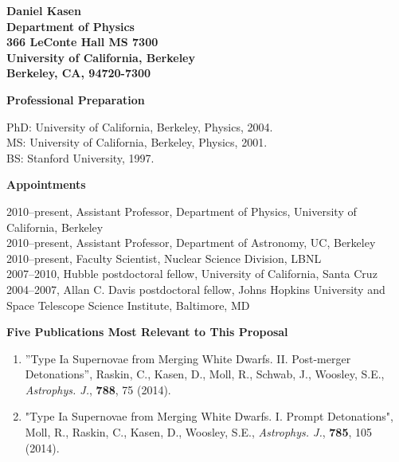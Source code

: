 \documentclass[11pt,letterpaper,english]{article}
\begin{document}
\setlength{\parindent}{0in} %

\pagestyle{fancy}   \renewcommand{%
\headrulewidth}{0.0pt}



\centering 
{\bf Daniel Kasen}\\
{\bf Department of Physics  \\
  366 LeConte Hall MS 7300 \\
  University of California, Berkeley \\
  Berkeley, CA, 94720-7300
} \smallskip

\begin{flushleft} {\bf Professional Preparation}
{\parindent 16pt

PhD: University of California, Berkeley, Physics,  2004.\\ 
MS: University of California, Berkeley, Physics,  2001.\\ 
BS: Stanford University, 1997. \\
}

\vspace{.04in}
{\bf Appointments}
{\parindent 16pt

2010--present, Assistant Professor, Department of Physics, University of California, Berkeley \\
2010--present, Assistant Professor, Department of Astronomy, UC, Berkeley \\
2010--present, Faculty Scientist, Nuclear Science Division, LBNL \\
2007--2010, Hubble postdoctoral fellow, University of California, Santa Cruz \\
2004--2007, Allan C. Davis postdoctoral fellow, Johns Hopkins University and Space Telescope Science Institute, Baltimore, MD \\
}

\vspace{.04in}
{\bf Five Publications Most Relevant to This Proposal}
\vspace{-6pt}
\begin{enumerate} \itemsep1pt \parskip0pt 

\item ''Type Ia Supernovae from Merging White Dwarfs. II. Post-merger Detonations'', Raskin, C., Kasen, D., 
Moll, R., Schwab, J., Woosley, S.E., \emph{Astrophys. J.}, {\bf 788}, 75 (2014).

\item "Type Ia Supernovae from Merging White Dwarfs. I. Prompt Detonations", 
Moll, R., Raskin, C., Kasen, D.,  Woosley, S.E., \emph{Astrophys. J.}, {\bf 785}, 105 (2014).


\end{enumerate}
\end{flushleft}
\end{document}
